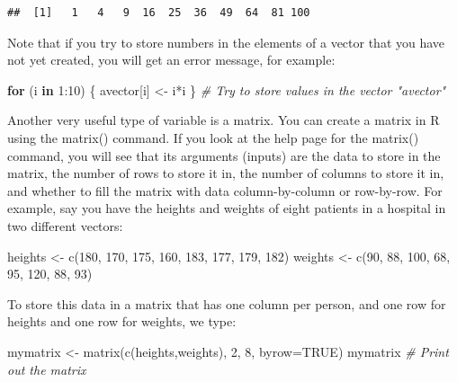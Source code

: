 \documentclass[
]{book}
\newenvironment{Shaded}{\begin{snugshade}}{\end{snugshade}}
\newcommand{\AttributeTok}[1]{\textcolor[rgb]{0.77,0.63,0.00}{#1}}
\newcommand{\CommentTok}[1]{\textcolor[rgb]{0.56,0.35,0.01}{\textit{#1}}}
\newcommand{\ConstantTok}[1]{\textcolor[rgb]{0.00,0.00,0.00}{#1}}
\newcommand{\ControlFlowTok}[1]{\textcolor[rgb]{0.13,0.29,0.53}{\textbf{#1}}}
\newcommand{\DecValTok}[1]{\textcolor[rgb]{0.00,0.00,0.81}{#1}}
\newcommand{\FunctionTok}[1]{\textcolor[rgb]{0.00,0.00,0.00}{#1}}
\newcommand{\NormalTok}[1]{#1}
\newcommand{\OtherTok}[1]{\textcolor[rgb]{0.56,0.35,0.01}{#1}}
\newcommand{\SpecialCharTok}[1]{\textcolor[rgb]{0.00,0.00,0.00}{#1}}
\begin{document}
\begin{verbatim}
##  [1]   1   4   9  16  25  36  49  64  81 100
\end{verbatim}

Note that if you try to store numbers in the elements of a vector that you have not yet created, you will get an error message, for example:

\begin{Shaded}
\begin{Highlighting}[]
\ControlFlowTok{for}\NormalTok{ (i }\ControlFlowTok{in} \DecValTok{1}\SpecialCharTok{:}\DecValTok{10}\NormalTok{) \{ }
\NormalTok{  avector[i] }\OtherTok{\textless{}{-}}\NormalTok{ i}\SpecialCharTok{*}\NormalTok{i }
\NormalTok{  \}  }\CommentTok{\# Try to store values in the vector "avector"}
\end{Highlighting}
\end{Shaded}

Another very useful type of variable is a matrix. You can create a matrix in R using the matrix() command. If you look at the help page for the matrix() command, you will see that its arguments (inputs) are the data to store in the matrix, the number of rows to store it in, the number of columns to store it in, and whether to fill the matrix with data column-by-column or row-by-row. For example, say you have the heights and weights of eight patients in a hospital in two different vectors:

\begin{Shaded}
\begin{Highlighting}[]
\NormalTok{heights }\OtherTok{\textless{}{-}} \FunctionTok{c}\NormalTok{(}\DecValTok{180}\NormalTok{, }\DecValTok{170}\NormalTok{, }\DecValTok{175}\NormalTok{, }\DecValTok{160}\NormalTok{, }\DecValTok{183}\NormalTok{, }\DecValTok{177}\NormalTok{, }\DecValTok{179}\NormalTok{, }\DecValTok{182}\NormalTok{)}
\NormalTok{weights }\OtherTok{\textless{}{-}} \FunctionTok{c}\NormalTok{(}\DecValTok{90}\NormalTok{, }\DecValTok{88}\NormalTok{, }\DecValTok{100}\NormalTok{, }\DecValTok{68}\NormalTok{, }\DecValTok{95}\NormalTok{, }\DecValTok{120}\NormalTok{, }\DecValTok{88}\NormalTok{, }\DecValTok{93}\NormalTok{)}
\end{Highlighting}
\end{Shaded}

To store this data in a matrix that has one column per person, and one row for heights and one row for weights, we type:

\begin{Shaded}
\begin{Highlighting}[]
\NormalTok{mymatrix }\OtherTok{\textless{}{-}} \FunctionTok{matrix}\NormalTok{(}\FunctionTok{c}\NormalTok{(heights,weights), }\DecValTok{2}\NormalTok{, }\DecValTok{8}\NormalTok{, }\AttributeTok{byrow=}\ConstantTok{TRUE}\NormalTok{)}
\NormalTok{mymatrix }\CommentTok{\# Print out the matrix}
\end{Highlighting}
\end{Shaded}
\end{document}
